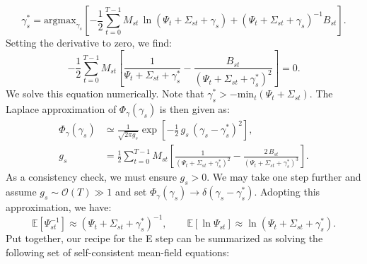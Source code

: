 \documentclass[nofootinbib,amssymb,amsmath]{revtex4}
\newcommand{\EE}{\mathbb{E}}
\begin{document}
\begin{equation}
\gamma^*_s = \mathrm{argmax}_{\gamma_s}\left[-\frac{1}{2}\sum_{t=0}^{T-1} M_{st} \, \ln(\Psi_t + \Sigma_{st} + \gamma_s) + (\Psi_t + \Sigma_{st} + \gamma_s)^{-1} B_{st} \right].
\end{equation}
Setting the derivative to zero, we find:
\begin{equation}
-\frac{1}{2} \sum_{t=0}^{T-1} M_{st}\left[\frac{1}{\Psi_t + \Sigma_{st} + \gamma^*_s} - \frac{B_{st}}{(\Psi_t + \Sigma_{st} + \gamma^*_s)^2}\right] = 0.
\end{equation}
We solve this equation numerically. Note that $\gamma_s^* > -\mathrm{min}_t (\Psi_t + \Sigma_{st})$. The Laplace approximation of $\Phi_\gamma(\gamma_s)$ is then given as:
\begin{align}
\Phi_\gamma(\gamma_s) &\simeq \frac{1}{\sqrt{2\pi g_s}}\exp\left[-\frac{1}{2}\,g_s\,(\gamma_s - \gamma^*_s)^2\right],\\
g_s &= \frac{1}{2}\sum_{t=0}^{T-1}M_{st}\left[\frac{1}{(\Psi_t + \Sigma_{st} + \gamma^*_s)^2} - \frac{2\,B_{st}}{(\Psi_t + \Sigma_{st} + \gamma^*_s)^3}\right].
\end{align}
As a consistency check, we must ensure $g_s > 0$. We may take one step further and assume $g_s \sim \mathcal{O}(T) \gg 1$ and set $\Phi_\gamma(\gamma_s) \rightarrow \delta(\gamma_s - \gamma^*_s)$. Adopting this approximation, we have:
\begin{equation}\label{eq:dirac_delta_gamma_posterior}
\EE[\Psi_{st}^{-1}] \approx (\Psi_{t} + \Sigma_{st} + \gamma_s^*)^{-1}, \qquad \EE[\ln \Psi_{st}] \approx \ln(\Psi_t + \Sigma_{st} + \gamma_s^*).
\end{equation}
Put together, our recipe for the E step can be summarized as solving the following set of self-consistent mean-field equations:
\end{document}
